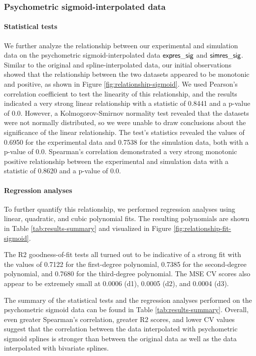 \subsubsection{Psychometric sigmoid-interpolated data}

\paragraph{Statistical tests}

We further analyze the relationship between our experimental and simulation data on the psychometric sigmoid-interpolated data $\mathsf{expres\_sig}$ and $\mathsf{simres\_sig}$. Similar to the original and spline-interpolated data, our initial observations showed that the relationship between the two datasets appeared to be monotonic and positive, as shown in Figure \ref{fig:relationship-sigmoid}. We used Pearson's correlation coefficient to test the linearity of this relationship, and the results indicated a very strong linear relationship with a statistic of 0.8441 and a p-value of 0.0. However, a Kolmogorov-Smirnov normality test revealed that the datasets were not normally distributed, so we were unable to draw conclusions about the significance of the linear relationship. The test's statistics revealed the values of 0.6950 for the experimental data and 0.7538 for the simulation data, both with a p-value of 0.0.
Spearman's correlation demonstrated a very strong monotonic positive relationship between the experimental and simulation data with a statistic of 0.8620 and a p-value of 0.0. 

\paragraph{Regression analyses}

To further quantify this relationship, we performed regression analyses using linear, quadratic, and cubic polynomial fits. The resulting polynomials are shown in Table \ref{tab:results-summary} and visualized in Figure \ref{fig:relationship-fit-sigmoid}. 

The R2 goodness-of-fit tests all turned out to be indicative of a strong fit with the values of 0.7122 for the first-degree polynomial, 0.7385 for the second-degree polynomial, and 0.7680 for the third-degree polynomial. The MSE CV scores also appear to be extremely small at 0.0006 (d1), 0.0005 (d2), and 0.0004 (d3). 

The summary of the statistical tests and the regression analyses performed on the psychometric sigmoid data can be found in Table \ref{tab:results-summary}. Overall, even greater Spearman's correlation, greater R2 scores, and lower CV values suggest that the correlation between the data interpolated with psychometric sigmoid splines is stronger than between the original data as well as the data interpolated with bivariate splines.